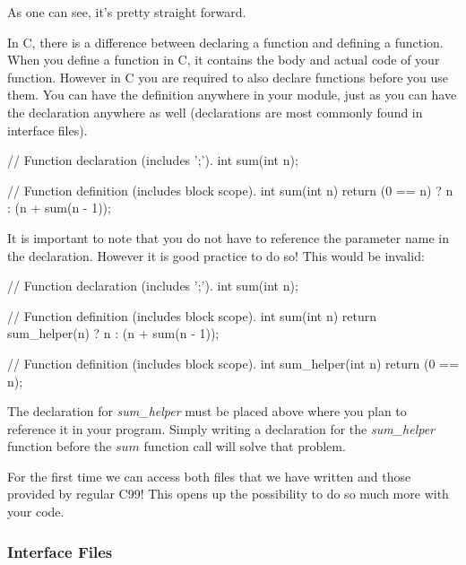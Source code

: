 As one can see, it's pretty straight forward.\\


In C, there is a difference between declaring a function and defining a function.  When you define a function in C, it contains the body and actual code of your function.  However in C you are required to also declare functions before you use them.  You can have the definition anywhere in your module, just as you can have the declaration anywhere as well (declarations are most commonly found in interface files).\\


\begin{code}[C]
// Function declaration (includes ';').
int sum(int n);

// Function definition (includes block scope).
int sum(int n)
{
	return (0 == n) ? n : (n + sum(n - 1));
}
\end{code}

It is important to note that you do not have to reference the parameter name in the declaration. However it is good practice to do so! This would be invalid:\\

\begin{code}[C]
// Function declaration (includes ';').
int sum(int n);

// Function definition (includes block scope).
int sum(int n)
{
	return sum_helper(n) ? n : (n + sum(n - 1));
}

// Function definition (includes block scope).
int sum_helper(int n)
{
	return (0 == n);
}
\end{code}

The declaration for \emph{sum\_helper} must be placed above where you plan to reference it in your program.  Simply writing a declaration for the \emph{sum\_helper} function before the $sum$ function call will solve that problem.\\



For the first time we can access both files that we have written and those provided by regular C99!  This opens up the possibility to do so much more with your code.

\subsubsection*{Interface Files}

